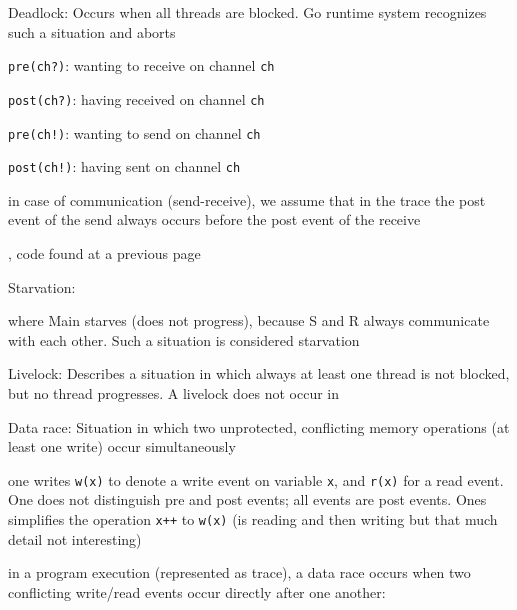 \documentclass[landscape, a4paper]{article}
\begin{document}
\begin{minipage}[t]{0.2\linewidth}
\begin{betterlist}
		\item \alert{Deadlock:} Occurs when all threads are blocked. Go runtime system recognizes such a situation and aborts
		\begin{betterlist}
			\item \verb|pre(ch?)|: wanting to receive on channel \verb|ch|
			\item \verb|post(ch?)|: having received on channel \verb|ch|
			\item \verb|pre(ch!)|: wanting to send on channel \verb|ch|
			\item \verb|post(ch!)|: having sent on channel \verb|ch|
			\item in case of communication (send-receive), we assume that in the trace the post event of the send always occurs before the post event of the receive
			\item {}, code found at a previous page
		\end{betterlist}
		\item \alert{Starvation:}
		\begin{betterlist}
			\item {} where Main starves (does not progress), because S and R always communicate with each other. Such a situation is considered starvation
		\end{betterlist}
		\item \alert{Livelock:} Describes a situation in which always at least one thread is not blocked, but no thread progresses. A livelock does not occur in \script{48}{Example}
		\item \alert{Data race:} Situation in which two unprotected, conflicting memory operations (at least one write) occur simultaneously
		\begin{betterlist}
			\item one writes \verb|w(x)| to denote a write event on variable \verb|x|, and \verb|r(x)| for a read event. One does not distinguish pre and post events; all events are post events. Ones simplifies the operation \verb|x++| to \verb|w(x)| (is reading and then writing but that much detail not interesting)
			\item in a program execution (represented as trace), a data race occurs when two conflicting write/read events occur directly after one another:


\end{betterlist}
\end{betterlist}
\end{minipage}
\end{document}
